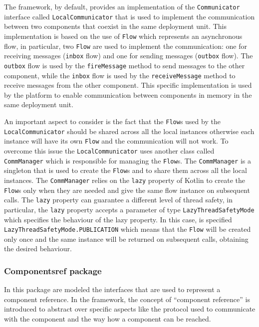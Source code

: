 

The framework, by default, provides an implementation of the \texttt{Communicator} interface called \texttt{LocalCommunicator} that is used to
implement the communication between two components that coexist in the same deployment unit. This implementation is based on the use of
\texttt{Flow} which represents an asynchronous flow, in particular, two \texttt{Flow} are used to implement the communication: one for receiving
messages (\texttt{inbox} flow) and one for sending messages (\texttt{outbox} flow).
The \texttt{outbox} flow is used by the \texttt{fireMessage} method to send messages to the other component, while the \texttt{inbox} flow is used
by the \texttt{receiveMessage} method to receive messages from the other component.
This specific implementation is used by the platform to enable communication between components in memory in the same deployment unit.

An important aspect to consider is the fact that the \texttt{Flow}s used by the \texttt{LocalCommunicator} should be shared across all the local instances otherwise each instance will have its own \texttt{Flow} and the communication will not work. To overcome this issue the
\texttt{LocalCommunicator} uses another class called \texttt{CommManager} which is responsible for managing the \texttt{Flow}s.
The \texttt{CommManager} is a singleton that is used to create the \texttt{Flow}s and to share them across all the local instances.
The \texttt{CommManager} relies on the \texttt{lazy} property of Kotlin to create the \texttt{Flow}s only when they are needed and give the same flow
instance on subsequent calls. The \texttt{lazy} property can guarantee a different level of thread safety, in particular, the \texttt{lazy} property
accepts a parameter of type \texttt{LazyThreadSafetyMode} which specifies the behaviour of the lazy property. In this case, is specified
\texttt{LazyThreadSafetyMode.PUBLICATION} which means that the \texttt{Flow} will be created only once and the same instance will be returned on
subsequent calls, obtaining the desired behaviour.

\subsubsection{Componentsref package}

In this package are modeled the interfaces that are used to represent a component reference.
In the framework, the concept of ``component reference'' is introduced to abstract over specific aspects like the protocol used to communicate with
the component and the way how a component can be reached.

